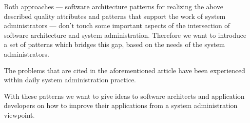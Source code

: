 Both approaches --- software architecture patterns for realizing the above described quality attributes and patterns that support the work of system administrators --- don't touch some important aspects of the intersection of software architecture and system administration. Therefore we want to introduce a set of patterns which bridges this gap, based on the needs of the system administrators. 

The problems that are cited in the aforementioned article have been experienced within daily system administration practice. 


With these patterns we want to give ideas to software architects and application developers on how to improve their applications from a system administration viewpoint. 

